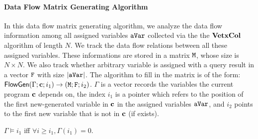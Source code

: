 \documentclass[a4paper,11pt]{article}
\begin{document}
\paragraph{Data Flow Matrix Generating Algorithm}
%
In this data flow matrix generating algorithm, we analyze the data flow information among all assigned variables $\mathtt{aVar}$ collected via the the $\bf{VetxCol}$ algorithm of length $N$.
%
We track the data flow relations between all these assigned variables. These informations are stored in a matrix $\mathtt{M}$, whose size is $N \times N$. 
We also track whether arbitrary variable is assigned with a query result in a vector $\mathtt{F}$ with size $|\mathtt{aVar}|$. 
%
The algorithm to fill in the matrix is of the form: $\mathsf{FlowGen}{(\Gamma ; \boldsymbol{\mathbf{c}} ; i_1)}\to {(\ensuremath{\mathtt{M}}; \ensuremath{\mathtt{F}}; {i_2})}$. 
$\Gamma$ is a vector records the variables the current program $\boldsymbol{\mathbf{c}}$ depends on, the index $i_1$ is a pointer which refers to the position of the first new-generated variable in $\boldsymbol{\mathbf{c}}$ in the assigned variables $\mathtt{aVar}$, and $i_2$ points to the first new variable that is not in $\boldsymbol{\mathbf{c}}$ (if exists). 
%
%
\begin{defn}
$\Gamma \vDash i_1$ iff $\forall i \geq i_1, \Gamma(i_1)=0 $.  
\end{defn}
%
%
\end{document}
